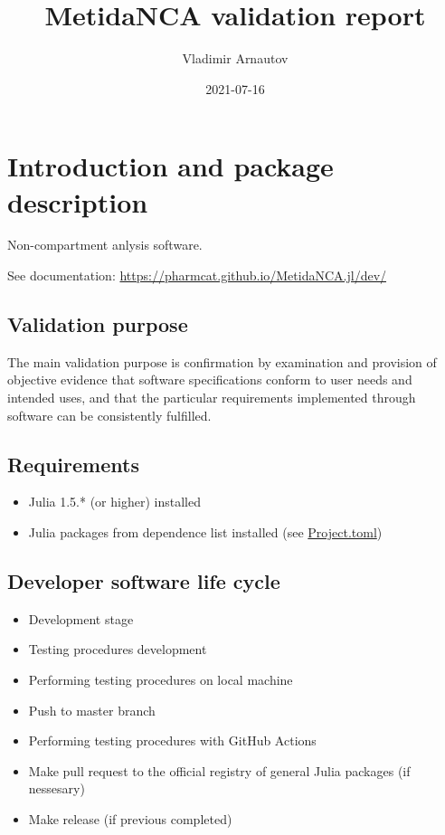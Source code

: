 \documentclass[12pt,a4paper]{article}
\title{ MetidaNCA validation report }
\author{ Vladimir Arnautov }
\date{ 2021-07-16 }
\begin{document}
\maketitle


\section{Introduction and package description}
Non-compartment anlysis software.

See documentation: \href{https://pharmcat.github.io/MetidaNCA.jl/dev/}{https://pharmcat.github.io/MetidaNCA.jl/dev/}

\subsection{Validation purpose}
The main validation purpose is confirmation by examination and provision of objective evidence that software specifications conform to user needs and intended uses, and that the particular requirements implemented through software can be consistently fulfilled.

\subsection{Requirements}
\begin{itemize}
\item Julia 1.5.* (or higher) installed


\item Julia packages from dependence list installed (see \href{https://github.com/PharmCat/MetidaNCA.jl/blob/main/Project.toml}{Project.toml})

\end{itemize}
\subsection{Developer software life cycle}
\begin{itemize}
\item Development stage


\item Testing procedures development


\item Performing testing procedures on local machine


\item Push to master branch


\item Performing testing procedures with GitHub Actions


\item Make pull request to the official registry of general Julia packages (if nessesary)


\item Make release (if previous completed)

\end{itemize}
\end{document}
